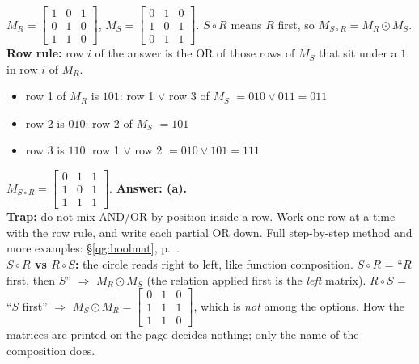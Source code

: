 \documentclass{fkt-notes}
\theoremstyle{definition}
\begin{document}
\begin{example}
  $M_R=\begin{bmatrix}1&0&1\\0&1&0\\1&1&0\end{bmatrix}$,
  $M_S=\begin{bmatrix}0&1&0\\1&0&1\\0&1&1\end{bmatrix}$.
  $S\circ R$ means $R$ first, so $M_{S\circ R}=M_R\odot M_S$. \textbf{Row
  rule:} row $i$ of the answer is the OR of those rows of $M_S$ that sit
  under a $1$ in row $i$ of $M_R$.
  \begin{itemize}[nosep]
    \item row 1 of $M_R$ is $101$: row 1 $\vee$ row 3 of $M_S$ $=010\vee011=011$
    \item row 2 is $010$: row 2 of $M_S$ $=101$
    \item row 3 is $110$: row 1 $\vee$ row 2 $=010\vee101=111$
  \end{itemize}
  $M_{S\circ R}=\begin{bmatrix}0&1&1\\1&0&1\\1&1&1\end{bmatrix}$.
  \textbf{Answer: (a).}\\
  \textbf{Trap:} do not mix AND/OR by position inside a row. Work one row
  at a time with the row rule, and write each partial OR down. Full
  step-by-step method and more examples: \S\ref{qg:boolmat}, p.~\pageref{qg:boolmat}.\\
  \textbf{$S\circ R$ vs $R\circ S$:} the circle reads right to left, like
  function composition. $S\circ R$ = ``$R$ first, then $S$'' $\Rightarrow$
  $M_R\odot M_S$ (the relation applied first is the \emph{left} matrix).
  $R\circ S$ = ``$S$ first'' $\Rightarrow$ $M_S\odot M_R=
  \begin{bmatrix}0&1&0\\1&1&1\\1&1&0\end{bmatrix}$, which is \emph{not} among
  the options. How the matrices are printed on the page decides nothing;
  only the name of the composition does.
\end{example}
\end{document}
